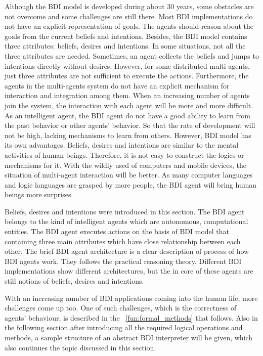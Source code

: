 Although the BDI model is developed during about 30 years, some obstacles are not overcome and some challenges are still there.
Most BDI implementations do not have an explicit representation of goals.
The agents should reason about the goals from the current beliefs and intentions.
Besides, the BDI model contains three attributes: beliefs, desires and intentions.
In some situations, not all the three attributes are needed.
Sometimes, an agent collects the beliefs and jumps to intentions directly without desires.
However, for some distributed multi-agents, just three attributes are not sufficient to execute the actions.
Furthermore, the agents in the multi-agents system do not have an explicit mechanism for interaction and integration among them.
When an increasing number of agents join the system, the interaction with each agent will be more and more difficult.
As an intelligent agent, the BDI agent do not have a good ability to learn from the past behavior or other agents’ behavior.
So that the rate of development will not be high, lacking mechanisms to learn from others.
However, BDI model has its own advantages.
Beliefs, desires and intentions are similar to the mental activities of human beings.
Therefore, it is not easy to construct the logics or mechanisms for it.
With the wildly used of computers and mobile devices, the situation of multi-agent interaction will be better.
As many computer languages and logic languages are grasped by more people, the BDI agent will bring human beings more surprises.

Beliefs, desires and intentions were introduced in this section.
The BDI agent belongs to the kind of intelligent agents which are autonomous, computational entities.
The BDI agent executes actions on the basis of BDI model that containing three main attributes which have close relationship between each other.
The brief BDI agent architecture is a clear description of process of how BDI agents work.
They follows the practical reasoning theory.
Different BDI implementations show different architectures, but the in core of these agents are still notions of beliefs, desires and intentions.

With an increasing number of BDI applications coming into the human life, more challenges come up too.
One of such challenges, which is the correctness of agents' behaviour, is described in the ~\autoref{fun:formal_methods} that follows.
Also in the following section after introducing all the required logical operations and methods, a sample structure of an abstract BDI interpreter will be given, which also continues the topic discussed in this section.
